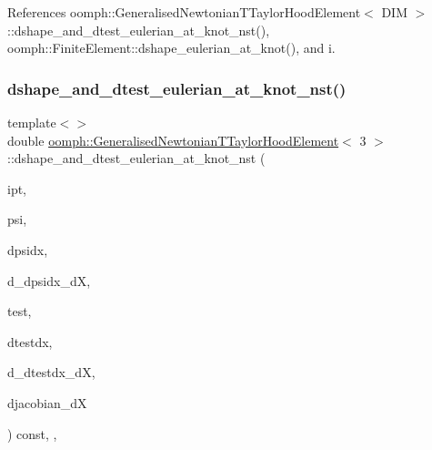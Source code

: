 References oomph\+::\+Generalised\+Newtonian\+T\+Taylor\+Hood\+Element$<$ D\+I\+M $>$\+::dshape\+\_\+and\+\_\+dtest\+\_\+eulerian\+\_\+at\+\_\+knot\+\_\+nst(), oomph\+::\+Finite\+Element\+::dshape\+\_\+eulerian\+\_\+at\+\_\+knot(), and i.

\mbox{\label{classoomph_1_1GeneralisedNewtonianTTaylorHoodElement_aa2dea94c7df3e7ce8b187e00ad9222cd}} 
\subsubsection{\texorpdfstring{dshape\+\_\+and\+\_\+dtest\+\_\+eulerian\+\_\+at\+\_\+knot\+\_\+nst()}{dshape\_and\_dtest\_eulerian\_at\_knot\_nst()}\hspace{0.1cm}{\footnotesize\ttfamily [4/4]}}
{\footnotesize\ttfamily template$<$$>$ \\
double \hyperlink{classoomph_1_1GeneralisedNewtonianTTaylorHoodElement}{oomph\+::\+Generalised\+Newtonian\+T\+Taylor\+Hood\+Element}$<$ 3 $>$\+::dshape\+\_\+and\+\_\+dtest\+\_\+eulerian\+\_\+at\+\_\+knot\+\_\+nst (\begin{DoxyParamCaption}\item[{const unsigned \&}]{ipt,  }\item[{\hyperlink{classoomph_1_1Shape}{Shape} \&}]{psi,  }\item[{\hyperlink{classoomph_1_1DShape}{D\+Shape} \&}]{dpsidx,  }\item[{\hyperlink{classoomph_1_1RankFourTensor}{Rank\+Four\+Tensor}$<$ double $>$ \&}]{d\+\_\+dpsidx\+\_\+dX,  }\item[{\hyperlink{classoomph_1_1Shape}{Shape} \&}]{test,  }\item[{\hyperlink{classoomph_1_1DShape}{D\+Shape} \&}]{dtestdx,  }\item[{\hyperlink{classoomph_1_1RankFourTensor}{Rank\+Four\+Tensor}$<$ double $>$ \&}]{d\+\_\+dtestdx\+\_\+dX,  }\item[{\hyperlink{classoomph_1_1DenseMatrix}{Dense\+Matrix}$<$ double $>$ \&}]{djacobian\+\_\+dX }\end{DoxyParamCaption}) const\hspace{0.3cm}{\ttfamily [inline]}, {\ttfamily [protected]}, {\ttfamily [virtual]}}


